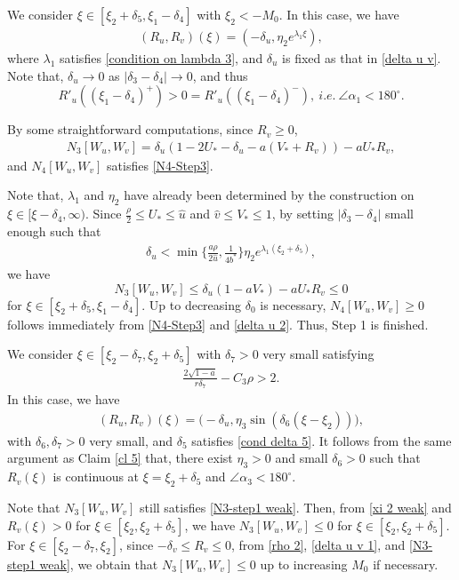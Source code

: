 \documentclass[11pt,a4paper]{article}
\numberwithin{equation}{section}
\numberwithin{figure}{section}
\newcommand\bea{\begin{eqnarray}}
\newcommand\eea{\end{eqnarray}}
\newcommand\beaa{\begin{eqnarray*}}
\newcommand\eeaa{\end{eqnarray*}}
\begin{document}
 We consider $\xi\in[\xi_2+\delta_5,\xi_1-\delta_4]$ with $\xi_2<-M_0$.
In this case, we have
\beaa
(R_u,R_v)(\xi)=(-\delta_u,\eta_2e^{\lambda_1\xi}),
\eeaa
where $\lambda_1$ satisfies \eqref{condition on lambda 3}, and $\delta_u$ is fixed as that in \eqref{delta u v}.
Note that, $\delta_u\to 0$ as $|\delta_3-\delta_4|\to 0$, and thus 
$$R'_u((\xi_1-\delta_{4})^+)>0=R'_u((\xi_1-\delta_{4})^-),\ i.e.\ \angle \alpha_1<180^{\circ}.$$

By some straightforward computations, since $R_v\ge 0$,
\bea\label{N3-step1 weak}
N_3[W_u,W_v]=\delta_u(1-2U_*-\delta_u-a(V_*+R_v))-aU_*R_v,
\eea
and $N_4[W_u,W_v]$ satisfies \eqref{N4-Step3}.

Note that, $\lambda_1$ and $\eta_2$ have already been determined by the construction on $\xi\in[\xi-\delta_4,\infty)$. Since $\frac{\rho}{2}\le U_*\le \hat u$ and $\hat v\le V_*\le 1$, by setting $|\delta_3-\delta_4|$ small enough such that
\bea\label{delta u 2}
\delta_u<\min\Big\{\frac{a\rho}{2\hat u},\frac{1}{4b^*}\Big\}\eta_2e^{\lambda_1(\xi_2+\delta_5)},
\eea
we have 
$$N_3[W_u,W_v]\le \delta_u(1-aV_*)-aU_*R_v\leq 0$$
 for $\xi\in[\xi_2+\delta_5,\xi_1-\delta_4]$.
Up to decreasing $\delta_0$ is necessary, $N_4[W_u,W_v]\geq 0$ follows immediately from \eqref{N4-Step3} and \eqref{delta u 2}. Thus, Step 1 is finished.

\medskip


 We consider $\xi\in[\xi_2-\delta_7,\xi_2+\delta_5]$ with $\delta_7>0$ very small satisfying
\bea\label{cond delta 7 system}
\frac{2\sqrt{1-a}}{r\delta_7}-C_3\rho>2.
\eea
In this case, we have
\beaa
(R_u,R_v)(\xi)=\Big(-\delta_u,\eta_3\sin(\delta_6(\xi-\xi_2))\Big),
\eeaa
with
$\delta_6, \delta_7>0$ very small, and $\delta_5$ satisfies \eqref{cond delta 5}.
It follows from the same argument as Claim \ref{cl 5} that, there exist $\eta_3>0$ and small $\delta_6>0$
such that $R_v(\xi)$ is continuous at $\xi=\xi_2+\delta_5$ and $\angle\alpha_3<180^{\circ}$.

Note that $N_3[W_u,W_v]$ still satisfies \eqref{N3-step1 weak}.
Then, from \eqref{xi 2 weak} and  $R_v(\xi)>0$ for $\xi\in[\xi_2,\xi_2+\delta_5]$, we have $N_3[W_u,W_v]\le 0$  for $\xi\in[\xi_2,\xi_2+\delta_5]$. For $\xi\in[\xi_2-\delta_7,\xi_2]$, since $-\delta_v\le R_v\le 0$,
from \eqref{rho 2}, \eqref{delta u v 1}, and \eqref{N3-step1 weak}, we obtain that $N_3[W_u,W_v]\le 0$ up to increasing $M_0$ if necessary.
\end{document}
